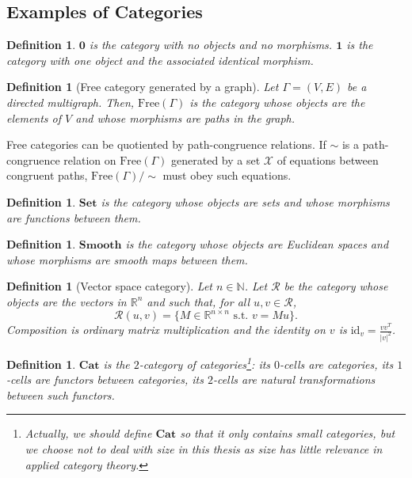 \documentclass[11pt,a4paper,openright,twoside]{report}
\theoremstyle{plain}
\newtheorem{definition}[proposition]{Definition}
\theoremstyle{definition}
\begin{document}
\subsection{Examples of Categories}

\begin{definition}
  $\mathbf{0}$ is the category with no objects and no morphisms. $\mathbf{1}$ is the category with one object and the associated identical morphism.
\end{definition}

\begin{definition}[Free category generated by a graph]
  \label{def: free}
  Let $\Gamma = (V,E)$ be a directed multigraph. Then, $\mathrm{Free}(\Gamma)$ is the category whose objects are the elements of $V$ and whose morphisms are paths in the graph.
\end{definition}

Free categories can be quotiented by path-congruence relations. If ${\sim}$ is a path-congruence relation on $\mathrm{Free}(\Gamma)$ generated by a set $\mathcal{X}$ of equations between congruent paths, $\mathrm{Free}(\Gamma)/{\sim}$ must obey such equations.

\begin{definition}
  \label{def: set}
  $\mathbf{Set}$ is the category whose objects are sets and whose morphisms are functions between them.
\end{definition}

\begin{definition}
  \label{def: smooth}
  $\mathbf{Smooth}$ is the category whose objects are Euclidean spaces and whose morphisms are smooth maps between them.
\end{definition}

\begin{definition}[Vector space category]
  \label{def: vecspacecat}
  Let $n \in \mathbb{N}$. Let $\mathcal{R}$ be the category whose objects are the vectors in $\mathbb{R}^n$ and such that, for all $u,v \in \mathcal{R}$, 
  \[\mathcal{R}(u, v) = \{M \in \mathbb{R}^{n \times n} \text{ s.t. } v = Mu\}.\]
  Composition is ordinary matrix multiplication and the identity on $v$ is $\mathrm{id}_v = \frac{vv^T}{|v|^2}$.
\end{definition}

\begin{definition}
  $\mathbf{Cat}$ is the $2$-category of categories\footnote{Actually, we should define $\mathbf{Cat}$ so that it only contains small categories, but we choose not to deal with size in this thesis as size has little relevance in applied category theory.}: its $0$-cells are categories, its $1$-cells are functors between categories, its $2$-cells are natural transformations between such functors.
\end{definition}
\end{document}
